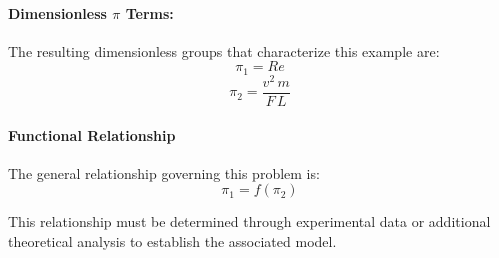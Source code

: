         \paragraph{Dimensionless $\pi$ Terms: }
        The resulting dimensionless groups that characterize this example are:
\begin{equation}
\pi_{1} = Re
\end{equation}
\begin{equation}
\pi_{2} = \frac{v^{2} \, m}{F \, L}
\end{equation}

                    \paragraph{Functional Relationship}
                    The general relationship governing this problem is:
                    \begin{equation}
                    \pi_1 = f(\pi_2)
                    \end{equation}

                    This relationship must be determined through experimental data or additional theoretical analysis to establish the associated model.
                    